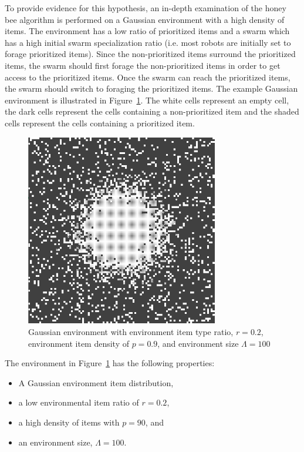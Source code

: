 To provide evidence for this hypothesis, an in-depth examination of the honey bee algorithm is performed on a Gaussian environment with a high density of items. The environment has a low ratio of prioritized items and a swarm which has a high initial swarm specialization ratio (i.e. most robots are initially set to forage prioritized items). Since the non-prioritized items surround the prioritized items, the swarm should first forage the non-prioritized items in order to get access to the prioritized items. Once the swarm can reach the prioritized items, the swarm should switch to foraging the prioritized items. The example Gaussian environment is illustrated in Figure~\ref{fig:gaussianhighdensityenv}. The white cells represent an empty cell, the dark cells represent the cells containing a non-prioritized item and the shaded cells represent the cells containing a prioritized item. 

\begin{figure}[htbp!]
    \centering
    \includegraphics[width=0.75\textwidth]{chapters/chapter6/figures/flexibility-gaussian-obj90-ratio.PNG}
    \caption{Gaussian environment with environment item type ratio, $r=0.2$, environment item density of $p=0.9$, and environment size $\Lambda=100$}
    \label{fig:gaussianhighdensityenv}
\end{figure}
    

The environment in Figure~\ref{fig:gaussianhighdensityenv} has the following properties:

\begin{itemize}
\item A Gaussian environment item distribution,
\item a low environmental item ratio of $r=0.2$,
\item a high density of items with $p=90$, and
\item an environment size, $\Lambda=100$.
\end{itemize}


